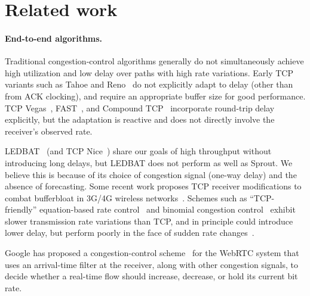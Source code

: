 \section{Related work}
\label{sprout:related}

\paragraph{End-to-end algorithms.}

Traditional congestion-control algorithms generally do not
simultaneously achieve high utilization and low delay over paths with
high rate variations.
Early TCP variants such as Tahoe and Reno~\cite{Jacobson88} do not
explicitly adapt to delay (other than from ACK clocking), and require
an appropriate buffer size for good performance. TCP
Vegas~\cite{vegas}, FAST~\cite{fasttcp}, and Compound TCP~\cite{compound}
incorporate round-trip delay explicitly, but the adaptation is
reactive and does not directly involve the receiver's observed rate.

LEDBAT~\cite{ledbat} (and TCP Nice~\cite{tcpnice}) share our goals of
high throughput without introducing long delays, but LEDBAT does not
perform as well as Sprout. We believe this is because of its choice of
congestion signal (one-way delay) and the absence of forecasting.
Some recent work proposes TCP receiver modifications to combat
bufferbloat in 3G/4G wireless networks~\cite{tcpbufferbloat}.
Schemes such as ``TCP-friendly'' equation-based
rate control~\cite{ebcc} and binomial congestion
control~\cite{binomial} exhibit slower transmission rate variations
than TCP, and in principle could introduce lower delay, but perform
poorly in the face of sudden rate changes~\cite{slowcc}.

Google has proposed a congestion-control scheme~\cite{WebRTCdraft} for
the WebRTC system that uses an arrival-time filter at the receiver,
along with other congestion signals, to decide whether a real-time
flow should increase, decrease, or hold its current bit rate.%

